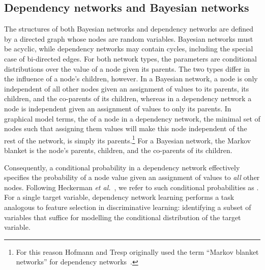\documentclass[runningheads,a4paper]{llncs}
\newcommand{\etal}{\textit{et al.}}
\begin{document}
 \subsection{Dependency networks and Bayesian networks} The structures of both Bayesian networks and dependency networks are defined by a directed graph whose nodes are random variables. Bayesian networks must be acyclic, while dependency networks may contain cycles, including the special case of bi-directed edges. For both network types, the parameters are conditional distributions over the value of a node given its parents. The two types differ in the  influence of a node's children, however. In a Bayesian network, a node is only independent of all other nodes given an assignment of values to its parents, its children, and the co-parents of its children, whereas in a dependency network a node is independent given an assignment of values to only its parents. In graphical model terms, the  of a node in a dependency network, the minimal set of nodes such that assigning them values will make this node independent of the rest of the network, is simply its parents.\footnote{For this reason Hofmann and Tresp originally used the term ``Markov blanket networks'' for dependency networks~\cite{Hofmann1998}.}
For a Bayesian network, the Markov blanket is the node's parents, children, and the co-parents of its children.

Consequently, a conditional probability in a dependency network effectively specifies the probability of a node value given an assignment of values to {\em all} other nodes. 
Following Heckerman \etal{}~\cite{Heckerman2000}, we refer to such conditional probabilities as . For a single target variable, dependency network learning performs a task analogous to feature selection in discriminative learning: identifying a subset of variables that suffice for modelling the conditional distribution of the target variable.
\end{document}
